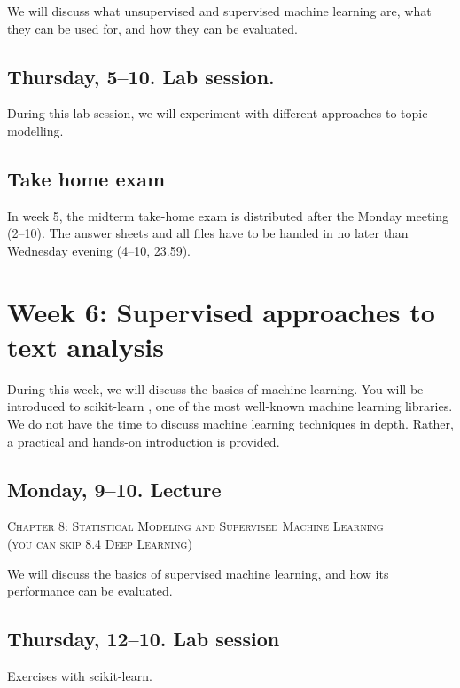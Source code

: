 We will discuss what unsupervised and supervised machine learning are, what they can be used for, and how they can be evaluated.

\subsection*{Thursday, 5--10. Lab session.}

During this lab session, we will experiment with different approaches to topic modelling. 

\subsection*{Take home exam}

In week 5, the  midterm take-home exam is distributed after the Monday meeting (2--10). The answer sheets and all files have to be handed in no later than Wednesday evening (4--10, 23.59).

\section*{Week 6: Supervised approaches to text analysis}

During this week, we will discuss the basics of machine learning. You will be introduced to scikit-learn \citep{scikit-learn}, one of the most well-known machine learning libraries. We do not have the time to discuss machine learning techniques in depth. Rather, a practical and hands-on introduction is provided. 

\subsection*{Monday, 9--10. Lecture}
\textsc{ Chapter 8: Statistical Modeling and Supervised Machine Learning}\\
\textsc{ (you can skip 8.4 Deep Learning)}\\
\textsc{ \cite{Boumans2016}}

We will discuss the basics of supervised machine learning, and how its performance can be evaluated. 

\subsection*{Thursday, 12--10. Lab session}
Exercises with scikit-learn.

